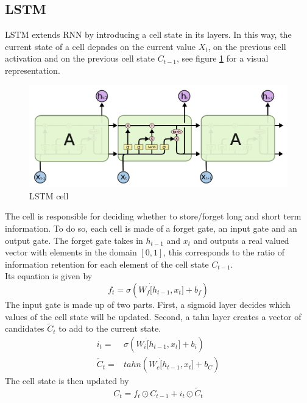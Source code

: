 \subsection{LSTM}

LSTM extends RNN by introducing a cell state in its layers. In this way, the current state of a cell depndes on the current value $X_t$, on the previous cell activation and on the previous cell state $C_{t-1}$, see figure \ref{fig:lstm_cell} for a visual representation. 
\begin{figure}[!h]
    \includegraphics[width=\textwidth]{images/lstm_cell.png}
    \caption{LSTM cell}
    \label{fig:lstm_cell}
\end{figure}
The cell is responsible for deciding whether to store/forget long and short term information. To do so, each cell is made of a forget gate, an input gate and an output gate.
The forget gate takes in $h_{t-1}$ and $x_t$ and outputs a real valued vector with elements in the domain $[0,1]$, this corresponds to the ratio of information retention for each element of the cell state $C_{t-1}$.
\\
Its equation is given by
\begin{equation}
    f_t=\sigma(W_f\dot[h_{t-1},x_t]+b_f)
\end{equation}
The input gate is made up of two parts. First, a sigmoid layer decides which values of the cell state will be updated. Second, a tahn layer creates a vector of candidates $\tilde{C}_t$ to add to the current state.
\begin{equation}
    \begin{aligned}
        i_t=&\sigma(W_i\dot[h_{t-1},x_t]+b_i)
        \\
        \tilde{C}_t=&tahn(W_c\dot[h_{t-1},x_t]+b_C)
    \end{aligned}
\end{equation}
The cell state is then updated by
\begin{equation}
    C_t=f_t\odot C_{t-1}+i_t\odot \tilde{C}_t
\end{equation}
